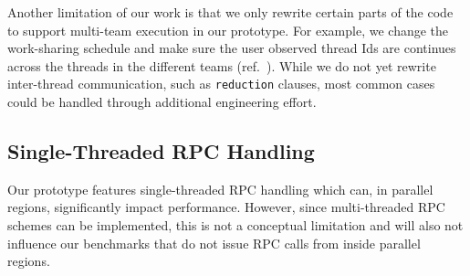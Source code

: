 Another limitation of our work is that we only rewrite certain parts of the code to support multi-team execution in our prototype.
For example, we change the work-sharing schedule and make sure the user observed thread Ids are continues across the threads in the different teams (ref.~).
While we do not yet rewrite inter-thread communication, such as \lstinline{reduction} clauses, most common cases could be handled through additional engineering effort.


\subsection{Single-Threaded RPC Handling}

Our prototype features single-threaded RPC handling which can, in parallel regions, significantly impact performance.
However, since multi-threaded RPC schemes can be implemented, this is not a conceptual limitation and will also not influence our benchmarks that do not issue RPC calls from inside parallel regions.
